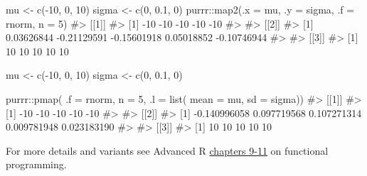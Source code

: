 \documentclass[
  letterpaper,
  DIV=11,
  numbers=noendperiod]{scrreprt}
\newenvironment{Shaded}{\begin{snugshade}}{\end{snugshade}}
\newcommand{\AttributeTok}[1]{\textcolor[rgb]{0.40,0.45,0.13}{#1}}
\newcommand{\CommentTok}[1]{\textcolor[rgb]{0.37,0.37,0.37}{#1}}
\newcommand{\DecValTok}[1]{\textcolor[rgb]{0.68,0.00,0.00}{#1}}
\newcommand{\FloatTok}[1]{\textcolor[rgb]{0.68,0.00,0.00}{#1}}
\newcommand{\FunctionTok}[1]{\textcolor[rgb]{0.28,0.35,0.67}{#1}}
\newcommand{\NormalTok}[1]{\textcolor[rgb]{0.00,0.23,0.31}{#1}}
\newcommand{\OtherTok}[1]{\textcolor[rgb]{0.00,0.23,0.31}{#1}}
\newcommand{\SpecialCharTok}[1]{\textcolor[rgb]{0.37,0.37,0.37}{#1}}
\begin{document}
\begin{Shaded}
\begin{Highlighting}[]
\NormalTok{mu }\OtherTok{\textless{}{-}} \FunctionTok{c}\NormalTok{(}\SpecialCharTok{{-}}\DecValTok{10}\NormalTok{, }\DecValTok{0}\NormalTok{, }\DecValTok{10}\NormalTok{)}
\NormalTok{sigma }\OtherTok{\textless{}{-}} \FunctionTok{c}\NormalTok{(}\DecValTok{0}\NormalTok{, }\FloatTok{0.1}\NormalTok{, }\DecValTok{0}\NormalTok{)}
\NormalTok{purrr}\SpecialCharTok{::}\FunctionTok{map2}\NormalTok{(}\AttributeTok{.x =}\NormalTok{ mu, }\AttributeTok{.y =}\NormalTok{ sigma, }\AttributeTok{.f =}\NormalTok{ rnorm, }\AttributeTok{n =} \DecValTok{5}\NormalTok{)}
\CommentTok{\#\textgreater{} [[1]]}
\CommentTok{\#\textgreater{} [1] {-}10 {-}10 {-}10 {-}10 {-}10}
\CommentTok{\#\textgreater{} }
\CommentTok{\#\textgreater{} [[2]]}
\CommentTok{\#\textgreater{} [1]  0.03626844 {-}0.21129591 {-}0.15601918  0.05018852 {-}0.10746944}
\CommentTok{\#\textgreater{} }
\CommentTok{\#\textgreater{} [[3]]}
\CommentTok{\#\textgreater{} [1] 10 10 10 10 10}
\end{Highlighting}
\end{Shaded}

\begin{Shaded}
\begin{Highlighting}[]
\NormalTok{mu }\OtherTok{\textless{}{-}} \FunctionTok{c}\NormalTok{(}\SpecialCharTok{{-}}\DecValTok{10}\NormalTok{, }\DecValTok{0}\NormalTok{, }\DecValTok{10}\NormalTok{)}
\NormalTok{sigma }\OtherTok{\textless{}{-}} \FunctionTok{c}\NormalTok{(}\DecValTok{0}\NormalTok{, }\FloatTok{0.1}\NormalTok{, }\DecValTok{0}\NormalTok{)}

\NormalTok{purrr}\SpecialCharTok{::}\FunctionTok{pmap}\NormalTok{(}
  \AttributeTok{.f =}\NormalTok{ rnorm, }
  \AttributeTok{n =} \DecValTok{5}\NormalTok{,}
  \AttributeTok{.l =} \FunctionTok{list}\NormalTok{(}
    \AttributeTok{mean =}\NormalTok{ mu, }
    \AttributeTok{sd =}\NormalTok{ sigma))}
\CommentTok{\#\textgreater{} [[1]]}
\CommentTok{\#\textgreater{} [1] {-}10 {-}10 {-}10 {-}10 {-}10}
\CommentTok{\#\textgreater{} }
\CommentTok{\#\textgreater{} [[2]]}
\CommentTok{\#\textgreater{} [1] {-}0.140996058  0.097719568  0.107271314  0.009781948  0.023183190}
\CommentTok{\#\textgreater{} }
\CommentTok{\#\textgreater{} [[3]]}
\CommentTok{\#\textgreater{} [1] 10 10 10 10 10}
\end{Highlighting}
\end{Shaded}

For more details and variants see Advanced R
\href{https://adv-r.hadley.nz/functionals.html}{chapters 9-11} on
functional programming.
\end{document}
